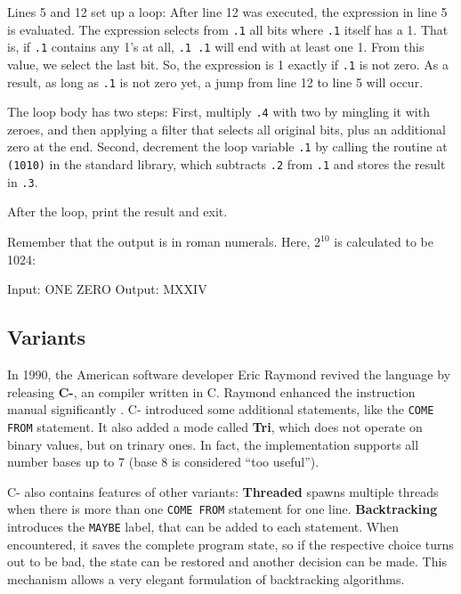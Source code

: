 Lines 5 and 12 set up a loop: After line 12 was executed, the expression in line 5 is evaluated. The expression selects from \texttt{.1} all bits where \texttt{.1} itself has a 1. That is, if \texttt{.1} contains any 1's at all, \texttt{.1~.1} will end with at least one 1. From this value, we select the last bit. So, the expression is 1 exactly if \texttt{.1} is not zero. As a result, as long as \texttt{.1} is not zero yet, a jump from line 12 to line 5 will occur.

The loop body has two steps: First, multiply \texttt{.4} with two by mingling it with zeroes, and then applying a filter that selects all original bits, plus an additional zero at the end. Second, decrement the loop variable \texttt{.1} by calling the routine at \texttt{(1010)} in the standard library, which subtracts \texttt{.2} from \texttt{.1} and stores the result in \texttt{.3}.

After the loop, print the result and exit.



Remember that the output is in roman numerals. Here, $2^{10}$ is calculated to be 1024:

\begin{io}
Input: ONE ZERO
Output: MXXIV
\end{io}

\subsection{Variants}
\label{intercal-variants}

In 1990, the American software developer Eric Raymond revived the language by releasing \textbf{C-\ic{}}, an \ic{} compiler written in C. Raymond enhanced the instruction manual significantly \cite{raymond2010cintercal}. C-\ic{} introduced some additional statements, like the \texttt{COME FROM} statement. It also added a mode called \textbf{Tri\ic{}}, which does not operate on binary values, but on trinary ones. In fact, the implementation supports all number bases up to 7 (base 8 is considered “too useful”).

C-\ic{} also contains features of other variants: \textbf{Threaded \ic{}} spawns multiple threads when there is more than one \texttt{COME FROM} statement for one line. \textbf{Backtracking \ic{}} introduces the \texttt{MAYBE} label, that can be added to each statement. When encountered, it saves the complete program state, so if the respective choice turns out to be bad, the state can be restored and another decision can be made. This mechanism allows a very elegant formulation of backtracking algorithms.

